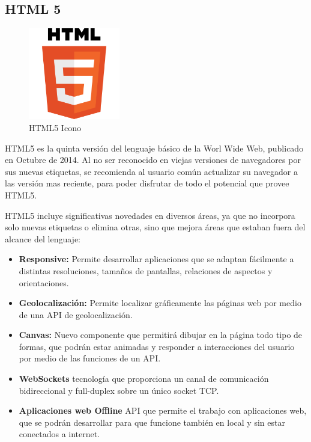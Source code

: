 \subsection{HTML 5}
\begin{figure}[!h]
    \centering
    \includegraphics[width=40mm]{img/introduccion/html5.png}
    \caption{HTML5 Icono}
\end{figure}
HTML5 es la quinta versión del lenguaje básico de la Worl Wide Web, publicado en Octubre de 2014. Al no ser reconocido en viejas versiones de navegadores por sus nuevas etiquetas, se recomienda al usuario común actualizar su navegador a las versión mas reciente, para poder disfrutar de todo el potencial que provee HTML5.

HTML5 incluye significativas novedades en diversos áreas, ya que no incorpora solo nuevas etiquetas o elimina otras, sino que mejora áreas que estaban fuera del alcance del lenguaje:

\begin{itemize}
    \item \textbf{Responsive: } Permite desarrollar aplicaciones que se adaptan fácilmente a distintas resoluciones, tamaños de pantallas, relaciones de aspectos y orientaciones.
    \item \textbf{Geolocalización: }Permite localizar gráficamente las páginas web por medio de una API de geolocalización.
    \item \textbf{Canvas: } Nuevo componente que permitirá dibujar en la página todo tipo de formas, que podrán estar animadas y responder a interacciones del usuario por medio de las funciones de un API.
    \item \textbf{WebSockets } tecnología que proporciona un canal de comunicación bidireccional y full-duplex sobre un único socket TCP.
    \item \textbf{Aplicaciones web Offline } API que permite el trabajo con aplicaciones web, que se podrán desarrollar para que funcione también en local y sin estar conectados a internet.
\end{itemize}
